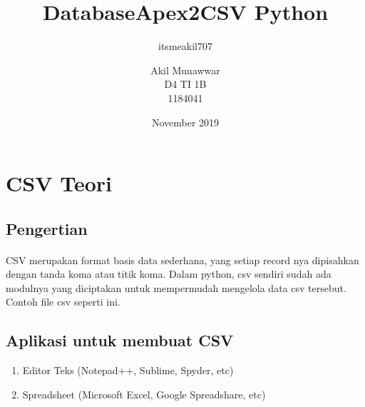 \documentclass{article}
\title{DatabaseApex2}
\author{itsmeakil707 }
\date{November 2019}
\begin{document}
\title{CSV Python}
\author{Akil Munawwar \\ D4 TI 1B \\ 1184041}
\maketitle

\section{CSV Teori}
\subsection{Pengertian}
\paragraph{}
CSV merupakan format basis data sederhana, yang setiap record nya dipisahkan dengan tanda koma atau titik koma. Dalam python, csv sendiri sudah ada modulnya yang diciptakan untuk mempermudah mengelola data csv tersebut. Contoh file csv seperti ini.

\subsection{Aplikasi untuk membuat CSV}
\begin{enumerate}
    \item Editor Teks (Notepad++, Sublime, Spyder, etc)
    \item Spreadsheet (Microsoft Excel, Google Spreadshare, etc)
\end{enumerate}
\end{document}
